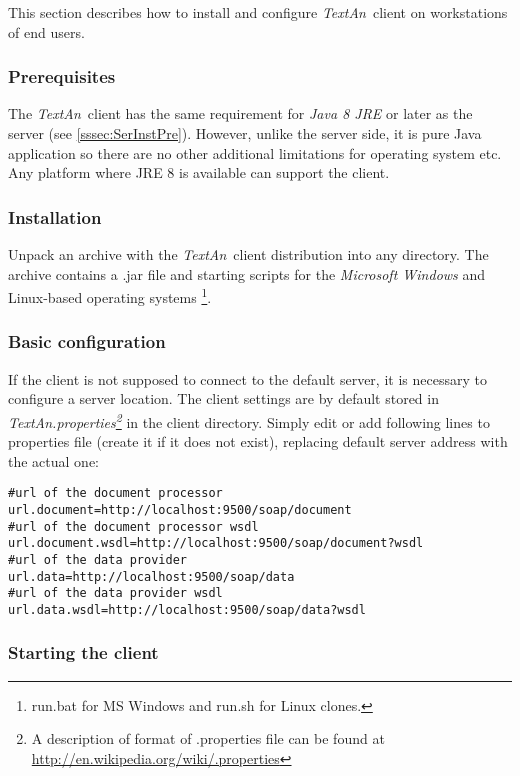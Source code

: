 \documentclass[12pt,a4paper]{report}
\newcommand{\textan}{\emph{TextAn}}
\begin{document}
This section describes how to install and configure \textan\ client on workstations of end users.

\subsubsection{Prerequisites}

The \textan\ client has the same requirement for \emph{Java 8 JRE} or later as the server (see \ref{sssec:SerInstPre}).
However, unlike the server side, it is pure Java application so there are no other additional limitations for operating system etc.
Any platform where JRE 8 is available can support the client.

\subsubsection{Installation}

Unpack an archive with the \textan\ client distribution into any directory. 
The archive contains a .jar file and starting scripts for the \emph{Microsoft Windows} and Linux-based operating systems
\footnote{run.bat for MS Windows and run.sh for Linux clones.\label{runscript_note}}.

\subsubsection{Basic configuration}

If the client is not supposed to connect to the default server, it is necessary to configure a server location. 
The client settings are by default stored in \emph{TextAn.properties\footnote{A description of format of .properties file can be found at \url{http://en.wikipedia.org/wiki/.properties}}}
in the client directory. 
Simply edit or add following lines to properties file (create it if it does not exist),
replacing default server address with the actual one:
\begin{lstlisting}[frame=single,language=properties]
#url of the document processor
url.document=http://localhost:9500/soap/document
#url of the document processor wsdl
url.document.wsdl=http://localhost:9500/soap/document?wsdl
#url of the data provider
url.data=http://localhost:9500/soap/data
#url of the data provider wsdl
url.data.wsdl=http://localhost:9500/soap/data?wsdl
\end{lstlisting}

\subsubsection{Starting the client}
\end{document}
